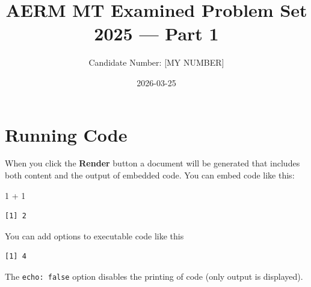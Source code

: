 \documentclass[
  letterpaper,
  DIV=11,
  numbers=noendperiod]{scrartcl}
\title{AERM MT Examined Problem Set 2025 --- Part 1}
\author{Candidate Number: {[}MY NUMBER{]}}
\date{2026-03-25}
\newenvironment{Shaded}{\begin{snugshade}}{\end{snugshade}}
\newcommand{\DecValTok}[1]{\textcolor[rgb]{0.68,0.00,0.00}{#1}}
\newcommand{\SpecialCharTok}[1]{\textcolor[rgb]{0.37,0.37,0.37}{#1}}
\renewcommand*\contentsname{Table of contents}
\newcommand\contentsname{Table of contents}
\begin{document}
\maketitle

\renewcommand*\contentsname{Table of contents}
{
\hypersetup{linkcolor=}
\setcounter{tocdepth}{3}
\tableofcontents
}

\section{}\label{section}

\section{Running Code}\label{running-code}

When you click the \textbf{Render} button a document will be generated
that includes both content and the output of embedded code. You can
embed code like this:

\begin{Shaded}
\begin{Highlighting}[]
\DecValTok{1} \SpecialCharTok{+} \DecValTok{1}
\end{Highlighting}
\end{Shaded}

\begin{verbatim}
[1] 2
\end{verbatim}

You can add options to executable code like this

\begin{verbatim}
[1] 4
\end{verbatim}

The \texttt{echo:\ false} option disables the printing of code (only
output is displayed).
\end{document}
